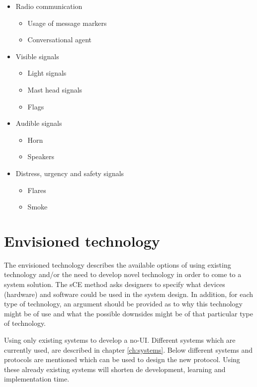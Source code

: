 \begin{itemize}
	\item Radio communication
	\begin{itemize}
		\item Usage of message markers
		\item Conversational agent
	\end{itemize}
	\item Visible signals
	\begin{itemize}
		\item Light signals
		\item Mast head signals
		\item Flags
	\end{itemize}
	\item Audible signals
	\begin{itemize}
		\item Horn
		\item Speakers
	\end{itemize}
	\item Distress, urgency and safety signals
	\begin{itemize}
		\item Flares
		\item Smoke
	\end{itemize}
\end{itemize}

\section{Envisioned technology}
The envisioned technology describes the available options of using existing technology and/or the need to develop novel technology in order to come to a system solution. The sCE method asks designers to specify what devices (hardware) and software could be used in the system design. In addition, for each type of technology, an argument should be provided as to why this technology might be of use and what the possible downsides might be of that particular type of technology.

Using only existing systems to develop a \acf{no-UI}. Different systems which are currently used, are described in chapter \ref{ch:systems}. Below different systems and protocols are mentioned which can be used to design the new protocol. Using these already existing systems will shorten de development, learning and implementation time.

